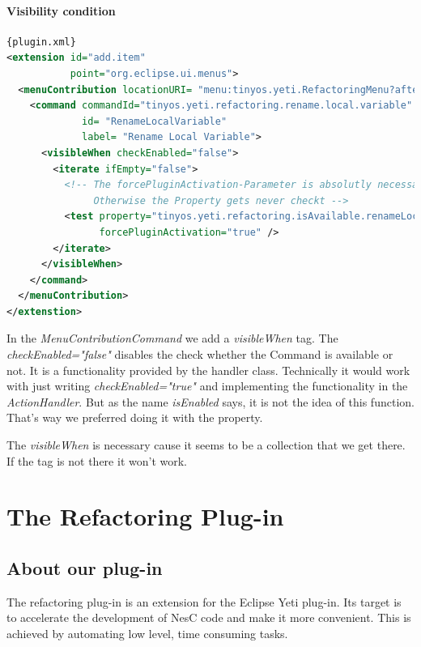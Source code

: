 \documentclass[a4paper,10pt]{report}
\begin{document}
\subsection{Visibility condition}


\begin{lstlisting}[language=XML,caption=Visibility condition ({\it plugin.xml})]{plugin.xml}
<extension id="add.item"
           point="org.eclipse.ui.menus">
  <menuContribution locationURI= "menu:tinyos.yeti.RefactoringMenu?after=additions">
    <command commandId="tinyos.yeti.refactoring.rename.local.variable"
             id= "RenameLocalVariable"
             label= "Rename Local Variable">
      <visibleWhen checkEnabled="false">
        <iterate ifEmpty="false">
          <!-- The forcePluginActivation-Parameter is absolutly necessary. 
               Otherwise the Property gets never checkt -->
          <test property="tinyos.yeti.refactoring.isAvailable.renameLocalVariable"
                forcePluginActivation="true" />
        </iterate>
      </visibleWhen>
    </command>
  </menuContribution>
</extenstion>
\end{lstlisting}
In the {\it MenuContributionCommand} we add a {\it visibleWhen} tag.
The {\it checkEnabled="false"} disables the check whether the Command is available or not. 
It is a functionality provided by the handler class.
Technically it would work with just writing {\it checkEnabled="true"} and implementing the functionality in the {\it ActionHandler}.
But as the name {\it isEnabled} says, it is not the idea of this function.
That's way we preferred doing it with the property.

The {\it visibleWhen} is necessary cause it seems to be a collection that we get there. If the tag is not there it won't work.

\part{The Refactoring Plug-in}
\chapter{About our plug-in}
The refactoring plug-in is an extension for the Eclipse Yeti plug-in.
Its target is to accelerate the development of NesC code and make it more convenient.
This is achieved by automating low level, time consuming tasks.
\end{document}
